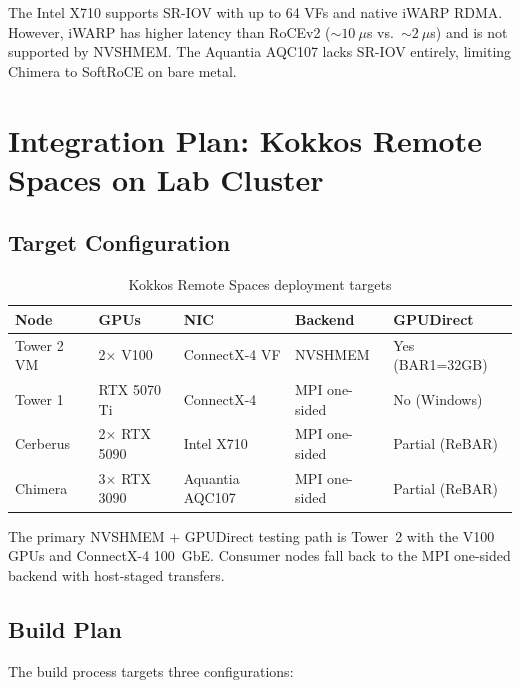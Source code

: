 \documentclass[11pt,letterpaper]{article}
\begin{document}
The Intel X710 supports SR-IOV with up to 64 VFs and native iWARP RDMA. However, iWARP has higher latency than RoCEv2 (${\sim}10~\mu$s vs.\ ${\sim}2~\mu$s) and is not supported by NVSHMEM. The Aquantia AQC107 lacks SR-IOV entirely, limiting Chimera to SoftRoCE on bare metal.

\section{Integration Plan: Kokkos Remote Spaces on Lab Cluster}
\label{sec:integration}

\subsection{Target Configuration}

\begin{table}[htbp]
\centering
\caption{Kokkos Remote Spaces deployment targets}
\label{tab:deployment}
\begin{tabular}{@{}lllll@{}}
\toprule
\textbf{Node} & \textbf{GPUs} & \textbf{NIC} & \textbf{Backend} & \textbf{GPUDirect} \\
\midrule
Tower 2 VM & 2$\times$ V100 & ConnectX-4 VF & NVSHMEM & Yes (BAR1=32GB) \\
Tower 1 & RTX 5070 Ti & ConnectX-4 & MPI one-sided & No (Windows) \\
Cerberus & 2$\times$ RTX 5090 & Intel X710 & MPI one-sided & Partial (ReBAR) \\
Chimera & 3$\times$ RTX 3090 & Aquantia AQC107 & MPI one-sided & Partial (ReBAR) \\
\bottomrule
\end{tabular}
\end{table}

The primary NVSHMEM + GPUDirect testing path is Tower~2 with the V100 GPUs and ConnectX-4 100~GbE. Consumer nodes fall back to the MPI one-sided backend with host-staged transfers.

\subsection{Build Plan}

The build process targets three configurations:
\end{document}
